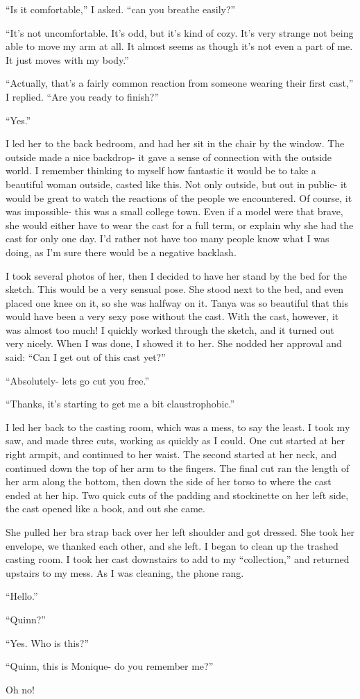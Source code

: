 ``Is it comfortable,'' I asked. ``can you breathe easily?''

``It's not uncomfortable. It's odd, but it's kind of cozy. It's very strange not being able
to move my arm at all. It almost seems as though it's not even a part of me. It just moves with
my body.''

``Actually, that's a fairly common reaction from someone wearing their first cast,'' I
replied. ``Are you ready to finish?''

``Yes.''

I led her to the back bedroom, and had her sit in the chair by the window. The outside made
a nice backdrop- it gave a sense of connection with the outside world. I remember thinking to
myself how fantastic it would be to take a beautiful woman outside, casted like this. Not only
outside, but out in public- it would be great to watch the reactions of the people we
encountered. Of course, it was impossible- this was a small college town. Even if a model were
that brave, she would either have to wear the cast for a full term, or explain why she had the
cast for only one day. I'd rather not have too many people know what I was doing, as I'm sure
there would be a negative backlash.

I took several photos of her, then I decided to have her stand by the bed for the sketch.
This would be a very sensual pose. She stood next to the bed, and even placed one knee on it, so
she was halfway on it. Tanya was so beautiful that this would have been a very sexy pose without
the cast. With the cast, however, it was almost too much! I quickly worked through the sketch,
and it turned out very nicely. When I was done, I showed it to her. She nodded her approval and
said: ``Can I get out of this cast yet?''

``Absolutely- lets go cut you free.''

``Thanks, it's starting to get me a bit claustrophobic.''

I led her back to the casting room, which was a mess, to say the least. I took my saw, and
made three cuts, working as quickly as I could. One cut started at her right armpit, and
continued to her waist. The second started at her neck, and continued down the top of her arm to
the fingers. The final cut ran the length of her arm along the bottom, then down the side of her
torso to where the cast ended at her hip. Two quick cuts of the padding and stockinette on her
left side, the cast opened like a book, and out she came.

She pulled her bra strap back over her left shoulder and got dressed. She took her envelope,
we thanked each other, and she left. I began to clean up the trashed casting room. I took her
cast downstairs to add to my ``collection,'' and returned upstairs to my mess. As I was
cleaning,
the phone rang.

``Hello.''

``Quinn?''

``Yes. Who is this?''

``Quinn, this is Monique- do you remember me?''

Oh no!
